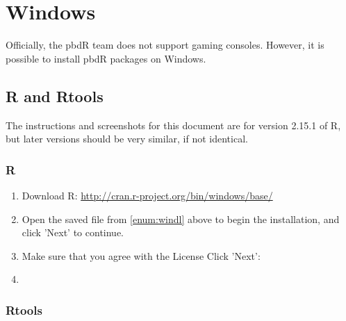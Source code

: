 \section{Windows}

Officially, the pbdR team does not support gaming consoles.  However, it is possible to install pbdR packages on Windows.

\subsection{R and Rtools}

The instructions and screenshots for this document are for version 2.15.1 of R, but later versions should be very similar, if not identical.






\subsubsection{R}

\begin{enumerate}
  \item Download R: \url{http://cran.r-project.org/bin/windows/base/}
  \item Open the saved file from \ref{enum:windl} above to begin the installation, and click 'Next' to continue.
  \item Make sure that you agree with the License Click 'Next':
  \item {}
\end{enumerate}





\subsubsection{Rtools}


